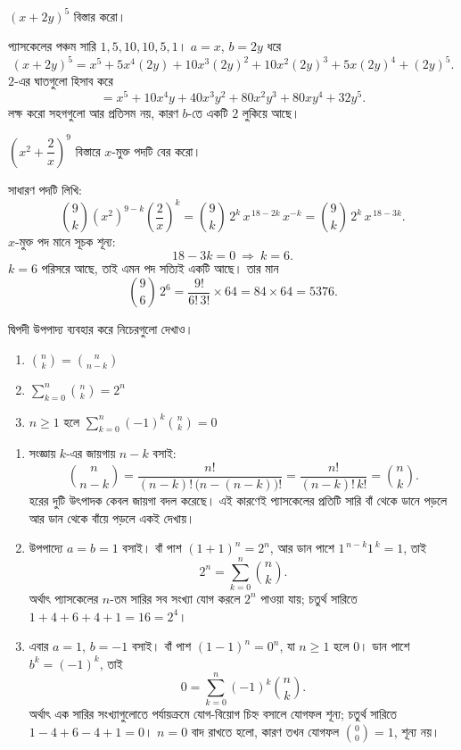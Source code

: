 \documentclass[11pt]{article}
\begin{document}
 $(x + 2y)^{5}$ বিস্তার করো।

\begin{sol}
প্যাসকেলের পঞ্চম সারি $1, 5, 10, 10, 5, 1$। $a = x$, $b = 2y$ ধরে
\[
  (x + 2y)^{5} = x^{5} + 5x^{4}(2y) + 10x^{3}(2y)^{2} + 10x^{2}(2y)^{3}
               + 5x(2y)^{4} + (2y)^{5} .
\]
$2$-এর ঘাতগুলো হিসাব করে
\[
  = x^{5} + 10x^{4}y + 40x^{3}y^{2} + 80x^{2}y^{3} + 80xy^{4} + 32y^{5} .
\]
লক্ষ করো সহগগুলো আর প্রতিসম নয়, কারণ $b$-তে একটি $2$ লুকিয়ে আছে।
\end{sol}

 $\left( x^{2} + \dfrac{2}{x} \right)^{9}$ বিস্তারে $x$-মুক্ত পদটি
বের করো।

\begin{sol}
সাধারণ পদটি লিখি:
\[
  \binom{9}{k} \left( x^{2} \right)^{9-k} \left( \frac{2}{x} \right)^{k}
  = \binom{9}{k}\, 2^{k}\, x^{\,18 - 2k}\, x^{-k}
  = \binom{9}{k}\, 2^{k}\, x^{\,18 - 3k} .
\]
$x$-মুক্ত পদ মানে সূচক শূন্য:
\[
  18 - 3k = 0 \ \Longrightarrow\ k = 6 .
\]
$k = 6$ পরিসরে আছে, তাই এমন পদ সত্যিই একটি আছে। তার মান
\[
  \binom{9}{6}\, 2^{6} = \frac{9!}{6!\,3!} \times 64 = 84 \times 64 = 5376 .
\]
\end{sol}

 দ্বিপদী উপপাদ্য ব্যবহার করে নিচেরগুলো দেখাও।
\begin{enumerate}
  \item $\displaystyle \binom{n}{k} = \binom{n}{n-k}$
  \item $\displaystyle \sum_{k=0}^{n} \binom{n}{k} = 2^{n}$
  \item $n \geq 1$ হলে
        $\displaystyle \sum_{k=0}^{n} (-1)^{k} \binom{n}{k} = 0$
\end{enumerate}

\begin{sol}
\begin{enumerate}
  \item সংজ্ঞায় $k$-এর জায়গায় $n-k$ বসাই:
        \[
          \binom{n}{n-k} = \frac{n!}{(n-k)!\,\big( n - (n-k) \big)!}
                         = \frac{n!}{(n-k)!\,k!} = \binom{n}{k} .
        \]
        হরের দুটি উৎপাদক কেবল জায়গা বদল করেছে। এই কারণেই প্যাসকেলের প্রতিটি
        সারি বাঁ থেকে ডানে পড়লে আর ডান থেকে বাঁয়ে পড়লে একই দেখায়।
  \item উপপাদ্যে $a = b = 1$ বসাই। বাঁ পাশ $(1+1)^{n} = 2^{n}$, আর ডান পাশে
        $1^{\,n-k} 1^{\,k} = 1$, তাই
        \[
          2^{n} = \sum_{k=0}^{n} \binom{n}{k} .
        \]
        অর্থাৎ প্যাসকেলের $n$-তম সারির সব সংখ্যা যোগ করলে $2^{n}$ পাওয়া যায়;
        চতুর্থ সারিতে $1+4+6+4+1 = 16 = 2^{4}$।
  \item এবার $a = 1$, $b = -1$ বসাই। বাঁ পাশ $(1 - 1)^{n} = 0^{n}$, যা
        $n \geq 1$ হলে $0$। ডান পাশে $b^{k} = (-1)^{k}$, তাই
        \[
          0 = \sum_{k=0}^{n} (-1)^{k} \binom{n}{k} .
        \]
        অর্থাৎ এক সারির সংখ্যাগুলোতে পর্যায়ক্রমে যোগ-বিয়োগ চিহ্ন বসালে
        যোগফল শূন্য; চতুর্থ সারিতে $1 - 4 + 6 - 4 + 1 = 0$।
        $n = 0$ বাদ রাখতে হলো, কারণ তখন যোগফল $\binom{0}{0} = 1$, শূন্য নয়।
\end{enumerate}
\end{sol}
\end{document}
